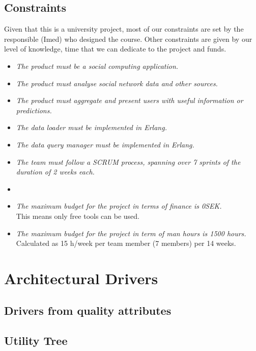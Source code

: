 \documentclass{article}
\begin{document}
\subsection{Constraints}
Given that this is a university project, most of our constraints are set by the responsible (Imed) who designed the course. Other constraints are given by our level of knowledge, time that we can dedicate to the project and funds.
\begin{itemize}
\item \textit{The product must be a social computing application.}
\item \textit{The product must analyse social network data and other sources.}
\item \textit{The product must aggregate and present users with useful information or predictions.}
\item \textit{The data loader must be implemented in Erlang.}
\item \textit{The data query manager must be implemented in Erlang.}
\item \textit{The team must follow a SCRUM process, spanning over 7 sprints of the duration of 2 weeks each.}
\item {}
\item \textit{The maximum budget for the project in terms of finance is 0SEK.}\\
This means only free tools can be used.
\item \textit{The maximum budget for the project in term of man hours is 1500 hours.}\\
Calculated as 15 h/week per team member (7 members) per 14 weeks.
\end{itemize}


\section{Architectural Drivers}

\subsection{Drivers from quality attributes}
\subsection{Utility Tree}
\end{document}
